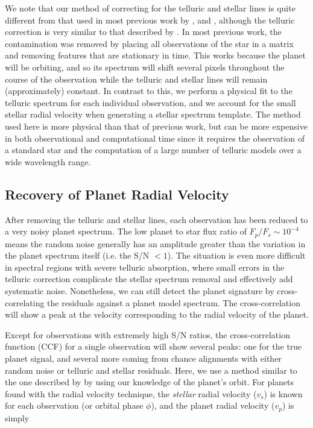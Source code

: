 We note that our method of correcting for the telluric and stellar lines is quite different from that used in most previous work by \cite{Brogi2012, Brogi2013}, and \cite{deKok2013}, although the telluric correction is very similar to that described by \cite{Rodler2012}. In most previous work, the contamination was removed by placing all observations of the star in a matrix and removing features that are stationary in time. This works because the planet will be orbiting, and so its spectrum will shift several pixels throughout the course of the observation while the telluric and stellar lines will remain (approximately) constant. In contrast to this, we perform a physical fit to the telluric spectrum for each individual observation, and we account for the small stellar radial velocity when generating a stellar spectrum template. The method used here is more physical than that of previous work, but can be more expensive in both observational and computational time since it requires the observation of a standard star and the computation of a large number of telluric models over a wide wavelength range.


\subsection{Recovery of Planet Radial Velocity}
\label{paper2_sec:rv_recovery}
After removing the telluric and stellar lines, each observation has
been reduced to a very noisy planet spectrum. The low
planet to star flux ratio of $F_p/F_s \sim 10^{-4}$ means the
random noise generally has an amplitude greater than the variation in
the planet spectrum itself (i.e. the S/N $<1$). The situation is even more difficult in spectral regions with severe telluric absorption, where small errors in the telluric correction complicate the stellar spectrum removal and effectively add systematic noise. Nonetheless, we can still detect the planet
signature by cross-correlating the residuals against a planet model
spectrum. The cross-correlation will show a peak at the velocity
corresponding to the radial velocity of the planet. 

Except for observations with extremely high S/N ratios, the cross-correlation function (CCF) for a single observation will show several peaks: one for the true planet signal, and several more coming from chance alignments with either random noise or telluric and stellar residuals. Here, we use a method similar to the one described by \cite{Brogi2012, Brogi2013} by using our knowledge of the planet's orbit. For planets found with the radial velocity technique, the \emph{stellar} radial velocity ($v_s$) is known for each observation (or orbital phase $\phi$), and the planet radial velocity ($v_p$) is simply

